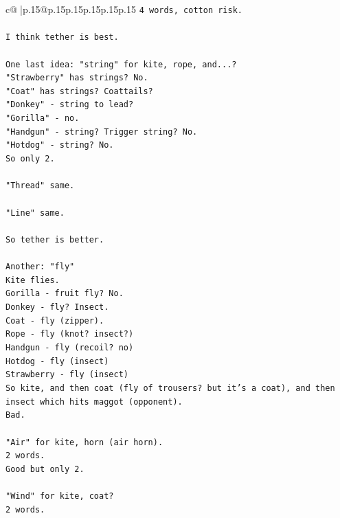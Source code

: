 \documentclass{article}
\begin{document}
{\begin{supertabular}{c@{$\;$}|p{.15\linewidth}@{}p{.15\linewidth}p{.15\linewidth}p{.15\linewidth}p{.15\linewidth}p{.15\linewidth}}
{{{\texttt{4 words, cotton risk.} \\
\\ 
\texttt{I think tether is best.} \\
\\ 
\texttt{One last idea: "string" for kite, rope, and...?} \\
\texttt{"Strawberry" has strings? No.} \\
\texttt{"Coat" has strings? Coattails?} \\
\texttt{"Donkey" {-} string to lead?} \\
\texttt{"Gorilla" {-} no.} \\
\texttt{"Handgun" {-} string? Trigger string? No.} \\
\texttt{"Hotdog" {-} string? No.} \\
\texttt{So only 2.} \\
\\ 
\texttt{"Thread" same.} \\
\\ 
\texttt{"Line" same.} \\
\\ 
\texttt{So tether is better.} \\
\\ 
\texttt{Another: "fly"} \\
\texttt{Kite flies.} \\
\texttt{Gorilla {-} fruit fly? No.} \\
\texttt{Donkey {-} fly? Insect.} \\
\texttt{Coat {-} fly (zipper).} \\
\texttt{Rope {-} fly (knot? insect?)} \\
\texttt{Handgun {-} fly (recoil? no)} \\
\texttt{Hotdog {-} fly (insect)} \\
\texttt{Strawberry {-} fly (insect)} \\
\texttt{So kite, and then coat (fly of trousers? but it's a coat), and then insect which hits maggot (opponent).} \\
\texttt{Bad.} \\
\\ 
\texttt{"Air" for kite, horn (air horn).} \\
\texttt{2 words.} \\
\texttt{Good but only 2.} \\
\\ 
\texttt{"Wind" for kite, coat?} \\
\texttt{2 words.} \\
}}}
\end{supertabular}}
\end{document}
